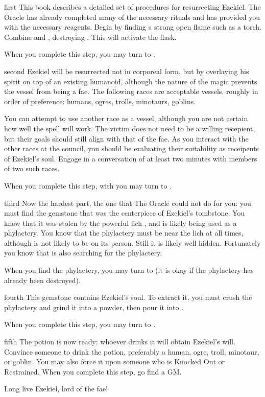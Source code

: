 \documentclass[notebook]{guildcamp2} %
\begin{document}
\startnotebook{\nEzekiel{}}

\begin{page}{first}
This book describes a detailed set of procedures for resurrecting Ezekiel. The Oracle has already completed many of the necessary rituals and 
has provided you with the necessary reagents. Begin by finding a strong open flame such as a torch. Combine \iFlask{} and \iQuintu{}, destroying
\iQuintu{}. This will activate the flask.

When you complete this step, you may turn to .
\end{page}

\begin{page}{second}
Ezekiel will be resurrected not in corporeal form, but by overlaying his spirit on top of an existing humanoid, although the nature of the magic
prevents the vessel from being a fae. The following races are acceptable vessels, roughly in order of preference: humans, ogres, trolls, minotaurs, goblins.

You can attempt to use another race as a vessel, although you are not certain how well the spell will work.
The victim does not need to be a willing recepient, but their goals should still align with that of the fae.
As you interact with the other races at the council, you should be evaluating their suitability as receipents
of Ezekiel's soul. Engage in a conversation of at least two minutes with members of two such races.

When you complete this step, with you may turn to .
\end{page}

\begin{page}{third}
Now the hardest part, the one that The Oracle could not do for you: you must find the gemstone that was the centerpiece of Ezekiel's tombstone.
You know that it was stolen by the powerful lich \cLich{}, and is likely being used as a phylactery. You know that the phylactery must be near
the lich at all times, although is not likely to be on its person. Still it is likely well hidden. Fortunately you know that \cEnt{}
is also searching for the phylactery.

When you find the phylactery, you may turn to  (it is okay if the phylactery has already been destroyed).
\end{page}


\begin{page}{fourth}
This gemstone contains Ezekiel's soul. To extract it, you must crush the phylactery and grind it into a powder, then pour it into \iFlask{}.

When you complete this step, you may turn to .
\end{page}

\begin{page}{fifth}
The potion is now ready: whoever drinks it will obtain Ezekiel's will. Convince someone to drink the potion, preferably a human, ogre, troll, minotaur, or goblin. You may also force it upon someone who is Knocked Out or Restrained. When you complete this step, go find a GM.

Long live Ezekiel, lord of the fae!
\end{page}

\endnotebook
\end{document}
